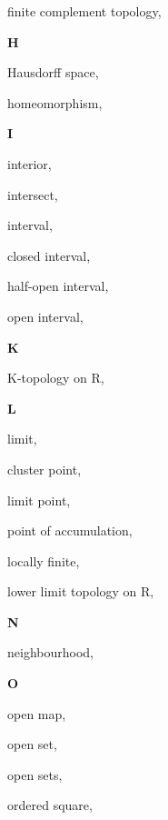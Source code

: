 \begin{multicols}{2}
finite complement topology, \pageref{def:FiniteComplementTopology}

\vspace{1em}\noindent\large{\textbf{H}}

Hausdorff space, \pageref{def:HausdorffSpace}

homeomorphism, \pageref{def:Homeomorphism}

\vspace{1em}\noindent\large{\textbf{I}}

interior, \pageref{def:Interior}

intersect, \pageref{def:Intersect}

interval, \pageref{def:Interval}

\hspace{1em}closed interval, \pageref{def:Interval}

\hspace{1em}half-open interval, \pageref{def:Interval}

\hspace{1em}open interval, \pageref{def:Interval}

\vspace{1em}\noindent\large{\textbf{K}}

K-topology on R, \pageref{def:KTopologyOnTheRealLine}

\vspace{1em}\noindent\large{\textbf{L}}

limit, \pageref{def:Limit}

cluster point, \pageref{def:LimitPoint}

limit point, \pageref{def:LimitPoint}

point of accumulation, \pageref{def:LimitPoint}

locally finite, \pageref{def:LocallyFinite}

lower limit topology on R, \pageref{def:LowerLimitTopologyOnTheRealLine}

\vspace{1em}\noindent\large{\textbf{N}}

neighbourhood, \pageref{def:Neighbourhood}

\vspace{1em}\noindent\large{\textbf{O}}

open map, \pageref{def:OpenMap}

open set, \pageref{def:OpenSet}

open sets, \pageref{def:OpenSets}

ordered square, \pageref{def:OrderedSquare}


\end{multicols}
